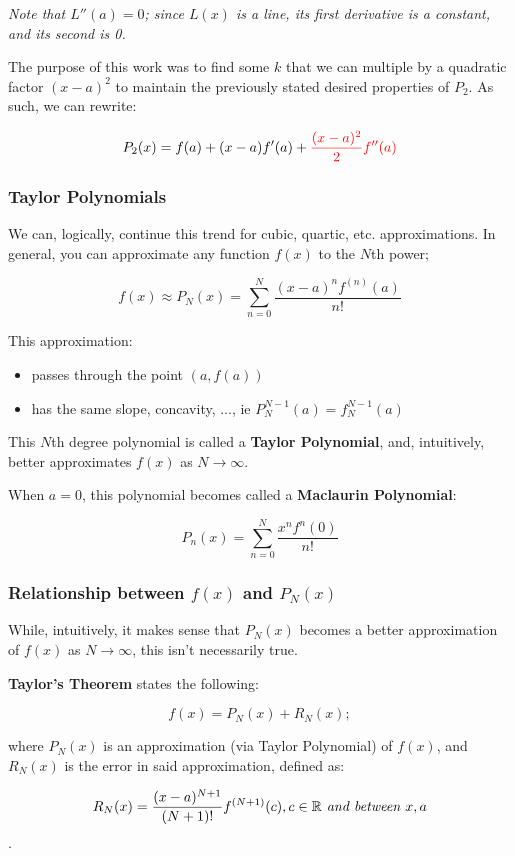 \documentclass[12pt]{article}
\begin{document}
\textit{Note that $L''(a) = 0$; since $L(x)$ is a line, its first derivative is a constant, and its second is 0.}

The purpose of this work was to find some $k$ that we can multiple by a quadratic factor $(x-a)^2$ to maintain the previously stated desired properties of $P_2$. As such, we can rewrite:

$$P_2(x) = f(a) + (x-a)f'(a) + \textcolor{red}{\frac{(x-a)^2}{2}f''(a)}$$

\subsubsection{Taylor Polynomials}
We can, logically, continue this trend for cubic, quartic, etc. approximations. In general, you can approximate any function $f(x)$ to the $N$th power;

$$f(x) \approx P_N(x) = \sum_{n=0}^{N} \frac{(x-a)^n f^{(n)}(a)}{n!}$$

This approximation:
\begin{itemize}
    \item passes through the point $(a,f(a))$
    \item has the same slope, concavity, ..., ie $P_N^{N-1}(a) = f_N^{N-1}(a)$
\end{itemize}

This $N$th degree polynomial is called a \textbf{Taylor Polynomial}, and, intuitively, better approximates $f(x)$ as $N \to \infty$.

When $a = 0$, this polynomial becomes called a \textbf{Maclaurin Polynomial}:

$$P_n(x) = \sum_{n=0}^{N} \frac{x^n f^n(0)}{n!}$$

\subsubsection{Relationship between \texorpdfstring{$f(x)$}{TEXT} and \texorpdfstring{$P_N(x)$}{TEXT}}

While, intuitively, it makes sense that $P_N(x)$ becomes a better approximation of $f(x)$ as $N\to\infty$, this isn't necessarily true.

\textbf{Taylor's Theorem} states the following:

$$f(x) = P_N(x) + R_N(x);$$

where $P_N(x)$ is an approximation (via Taylor Polynomial) of $f(x)$, and $R_N(x)$ is the error in said approximation, defined as:

$$R_N(x) = \frac{(x-a)^{N+1}}{(N+1)!}f^{(N+1)}(c), c \in \mathbb{R} \textit{ and between } x, a$$.
\end{document}
